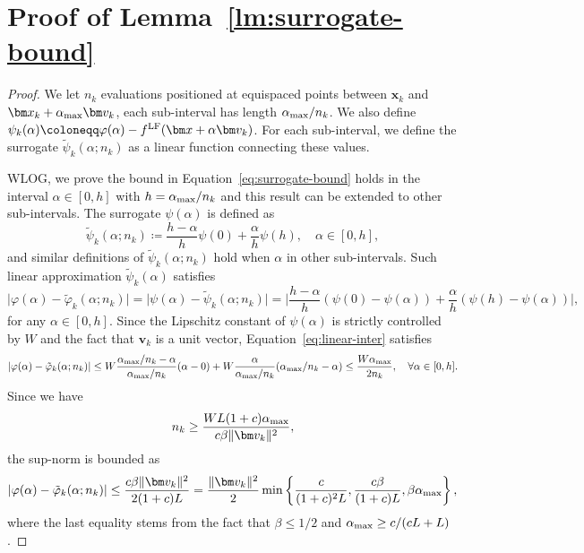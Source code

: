 \documentclass[10pt]{article} %
\numberwithin{equation}{section}
\theoremstyle{plain}
\theoremstyle{definition}
\newcommand{\<}{\langle}
\renewcommand{\>}{\rangle}
\renewcommand{\(}{\left(}
\renewcommand{\)}{\right)}
\renewcommand{\[}{\left[}
\renewcommand{\]}{\right]}
\newcommand{\LF}{\textup{LF}}
\newcommand{\alphaMax}{\alpha_\textup{max}}
\newcommand{\Lip}{L}
\newcommand{\interceptSurrogate}{\tilde{\psi}_k}
\newcommand{\HFSurrogate}{\tilde{\varphi}_k}
\begin{document}
\section{Proof of Lemma~\ref{lm:surrogate-bound}}
\label{apdx:lmm-pf}
\begin{proof}
We let $n_k$ evaluations positioned at equispaced points between $\bm x_k$ and $\bm x_k + \alphaMax\bm v_k$, each sub-interval has length $\alphaMax/n_k$. We also define $\psi_k(\alpha)\coloneqq \varphi(\alpha) - f^\LF(\bm x + \alpha\bm v_k)$. For each sub-interval, we define the surrogate $\interceptSurrogate(\alpha; n_k)$ as a linear function connecting these values.

WLOG, we prove the bound in Equation~\eqref{eq:surrogate-bound} holds in the interval $\alpha\in[0, h]$ with $h=\alphaMax/n_k$ and this result can be extended to other sub-intervals. The surrogate $\psi(\alpha)$ is defined as
\begin{equation}
\interceptSurrogate(\alpha;n_k) \coloneqq \frac{h-\alpha}{h}\psi(0) + \frac{\alpha}{h}\psi(h),\quad \alpha\in[0,h],
\end{equation}
and similar definitions of $\interceptSurrogate(\alpha;n_k)$ hold when $\alpha$ in other sub-intervals. Such linear approximation $\interceptSurrogate(\alpha)$ satisfies
\begin{equation}
\label{eq:linear-inter}
\lvert \varphi(\alpha) - \HFSurrogate(\alpha; n_k)\rvert = 
\vert \psi(\alpha) - \interceptSurrogate(\alpha;n_k)\vert = \bigg\vert \frac{h-\alpha}{h}\left(\psi(0)-\psi(\alpha)\right) + \frac{\alpha}{h}\left(\psi(h)-\psi(\alpha)\right)\bigg\vert,
\end{equation}
for any $\alpha\in[0,h]$. Since the Lipschitz constant of $\psi(\alpha)$ is strictly controlled by $W$ and the fact that $\bm v_k$ is a unit vector, Equation~\eqref{eq:linear-inter} satisfies
\begin{equation}
\lvert \varphi(\alpha) - \HFSurrogate(\alpha; n_k)\rvert \leq W\frac{\alphaMax/n_k-\alpha}{\alphaMax/n_k}(\alpha-0) + W\frac{\alpha}{\alphaMax/n_k}(\alphaMax/n_k-\alpha) \leq \frac{W \alphaMax}{2n_k},\quad\forall \alpha\in[0,h].
\end{equation}
Since we have 
\begin{equation}
    n_k \geq \frac{W\Lip(1+c)\alphaMax}{c\beta\lVert\bm v_k\rVert^2}, %
\end{equation}
the sup-norm is bounded as 
\begin{equation}
    \lvert \varphi(\alpha) - \HFSurrogate(\alpha; n_k)\rvert \leq \frac{c\beta\lVert\bm v_k\rVert^2}{2(1+c)\Lip} = \frac{\lVert \bm v_k\rVert^2}{2} \min\left\{\frac{c}{(1+c)^2\Lip}, \frac{c\beta}{(1+c)\Lip}, \beta \alphaMax\right\},
\end{equation}
where the last equality stems from the fact that $\beta\leq 1/2$ and $\alphaMax \geq c/(c\Lip + \Lip)$.
\end{proof}
\end{document}
